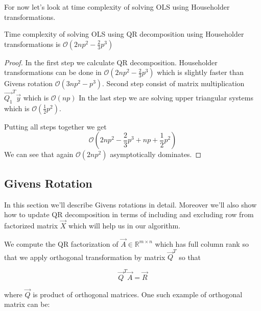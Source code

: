 For now let's look at time complexity of solving OLS using Householder transformations. 
\begin{observation}
	Time complexity of solving OLS using QR decomposition using Householder transformations is $\mathcal{O}(2np^2 - \frac{2}{3}p^3)$
\end{observation}
\begin{proof}
	In the first step we calculate QR decomposition. Householder transformations can be done in $\mathcal{O}(2np^2 - \frac{2}{3}p^3)$   which is slightly faster than Givens rotation $\mathcal{O}(3np^2 - p^3)$.
	Second step consist of matrix multiplication $\vec{Q_1}^T \vec{y}$ which is $\mathcal{O}(np)$
	In the last step we are solving upper triangular systems which is
	 $\mathcal{O}(\frac{1}{2}p^2)$.

	Putting all steps together we get  
	\begin{equation} \label{timewholeQR}
		\mathcal{O}(2np^2 - \frac{2}{3}p^3 + np + \frac{1}{2}p^2)
	\end{equation}
	We can see that again $\mathcal{O}(2np^2)$ asymptotically dominates.
\end{proof}


\subsection*{Givens Rotation} \label{givensrotation}%
In this section we'll describe Givens rotations in detail. Moreover we'll also show how to update QR decomposition in terms of including and excluding row from factorized matrix $\vec{X}$ which will help us in our algorithm.

We compute the QR factorization of $\vec{A} \in \mathbb{R}^{m \times n}$ which has full column rank so that we apply orthogonal transformation by matrix $\vec{Q}^T$ so that \cite{hammarling2008updatingqr}

\begin{equation}
	\vec{Q}^T\vec{A} = \vec{R}
\end{equation}
 
where $\vec{Q}$ is product of orthogonal matrices. One such example of orthogonal matrix can be:

